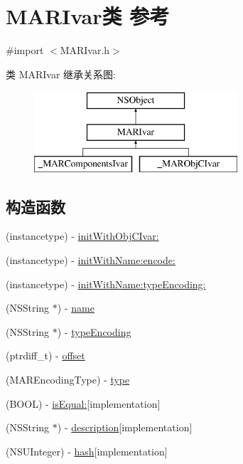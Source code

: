 \hypertarget{interface_m_a_r_ivar}{}\section{M\+A\+R\+Ivar类 参考}
\label{interface_m_a_r_ivar}


{\ttfamily \#import $<$M\+A\+R\+Ivar.\+h$>$}

类 M\+A\+R\+Ivar 继承关系图\+:\begin{figure}[H]
\begin{center}
\leavevmode
\includegraphics[height=3.000000cm]{interface_m_a_r_ivar}
\end{center}
\end{figure}
\subsection*{构造函数}
\begin{DoxyCompactItemize}
\item 
(instancetype) -\/ \hyperlink{interface_m_a_r_ivar_ae9ab588059c47c23a19de406155c3e70}{init\+With\+Obj\+C\+Ivar\+:}
\item 
(instancetype) -\/ \hyperlink{interface_m_a_r_ivar_a8667bca998283c79f25b8aa671a26f3e}{init\+With\+Name\+:encode\+:}
\item 
(instancetype) -\/ \hyperlink{interface_m_a_r_ivar_ad76c8d5f5e52f59678fb7f3d8746fe3c}{init\+With\+Name\+:type\+Encoding\+:}
\item 
(N\+S\+String $\ast$) -\/ \hyperlink{interface_m_a_r_ivar_a9bb452e4b5f0d1517f4e6b2c9f328af7}{name}
\item 
(N\+S\+String $\ast$) -\/ \hyperlink{interface_m_a_r_ivar_a8e78dbba396310694769832c7e82d27d}{type\+Encoding}
\item 
(ptrdiff\+\_\+t) -\/ \hyperlink{interface_m_a_r_ivar_a12af4637622b339aac3f19bc83c12c11}{offset}
\item 
(M\+A\+R\+Encoding\+Type) -\/ \hyperlink{interface_m_a_r_ivar_ad7448d482c83c03015e0037578516af1}{type}
\item 
(B\+O\+OL) -\/ \hyperlink{interface_m_a_r_ivar_aeeb47e39d903cfcd7d7d053a9dba8a06}{is\+Equal\+:}{\ttfamily  \mbox{[}implementation\mbox{]}}
\item 
(N\+S\+String $\ast$) -\/ \hyperlink{interface_m_a_r_ivar_a47c44d88f25acc48cc96ea3a5775c7c9}{description}{\ttfamily  \mbox{[}implementation\mbox{]}}
\item 
(N\+S\+U\+Integer) -\/ \hyperlink{interface_m_a_r_ivar_a52d39d3a8d316e090b32c5bb63fbe0d6}{hash}{\ttfamily  \mbox{[}implementation\mbox{]}}
\end{DoxyCompactItemize}
